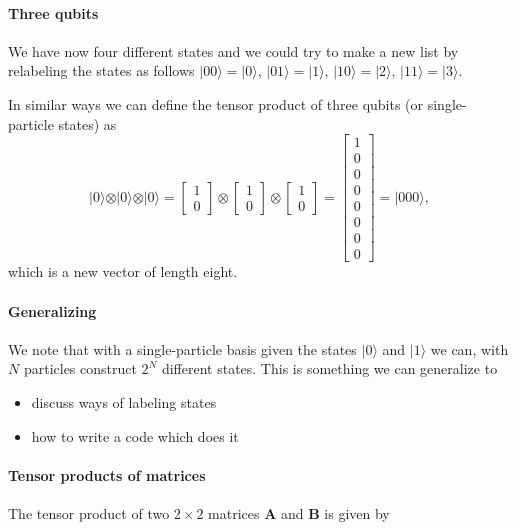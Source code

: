 \paragraph{Three qubits}
We have now four different states and we could try to make a new list
by relabeling the states as follows $\vert 00 \rangle =\vert 0
\rangle$, $\vert 01 \rangle =\vert 1 \rangle$, $\vert 10 \rangle
=\vert 2 \rangle$, $\vert 11 \rangle =\vert 3 \rangle$.

In similar ways we can define the tensor product of three qubits (or single-particle states) as
\[
\vert 0 \rangle \otimes \vert 0 \rangle \otimes \vert 0 \rangle = \begin{bmatrix} 1 \\ 0\end{bmatrix} \otimes \begin{bmatrix} 1 \\ 0\end{bmatrix} \otimes \begin{bmatrix} 1 \\ 0\end{bmatrix}=\begin{bmatrix} 1 \\ 0 \\ 0 \\ 0 \\ 0 \\0 \\ 0 \\ 0\end{bmatrix}=\vert 000 \rangle, 
\]
which is a new vector of length eight.


\paragraph{Generalizing}

We note that with a single-particle basis given the states $\vert
0\rangle$ and $\vert 1\rangle$ we can, with $N$ particles construct
$2^N$ different states.  This is something we can generalize to
\begin{itemize}
\item discuss ways of labeling states

\item how to write a code which does it
\end{itemize}



\paragraph{Tensor products of matrices}
The tensor product of two $2\times 2$ matrices $\bm{A}$ and $\bm{B}$ is given by

